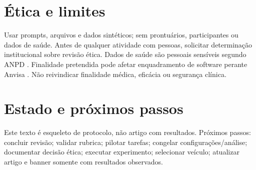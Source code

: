 \documentclass[article,12pt,oneside,a4paper,brazil]{abntex2}
\begin{document}
\section{Ética e limites}
Usar prompts, arquivos e dados sintéticos; sem prontuários, participantes ou dados de saúde. Antes de qualquer atividade com pessoas, solicitar determinação institucional sobre revisão ética. Dados de saúde são pessoais sensíveis segundo ANPD \cite{anpd2026faq}. Finalidade pretendida pode afetar enquadramento de software perante Anvisa \cite{anvisa2022samd}. Não reivindicar finalidade médica, eficácia ou segurança clínica.

\section{Estado e próximos passos}
Este texto é esqueleto de protocolo, não artigo com resultados. Próximos passos: concluir revisão; validar rubrica; pilotar tarefas; congelar configurações/análise; documentar decisão ética; executar experimento; selecionar veículo; atualizar artigo e banner somente com resultados observados.

\postextual


\end{document}
